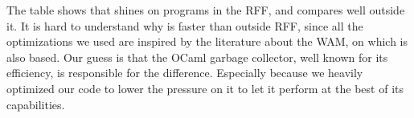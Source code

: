 \documentclass{llncs}
\begin{document}
The table shows that \elpi{} shines on programs in the RFF, and compares well
outside it.  It is hard to understand why \elpi{} is faster than \tedius{}
outside RFF, since all the optimizations we used are inspired by the
literature about the WAM, on which \tedius{} is also based.  Our guess is that
the OCaml garbage collector, well known for its efficiency, is responsible for
the difference. Especially because we heavily optimized our code to lower the
pressure on it to let it perform at the best of its
capabilities.


 


\end{document}
